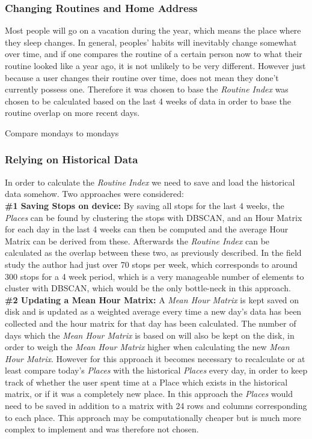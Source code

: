 \subsubsection*{Changing Routines and Home Address}
Most people will go on a vacation during the year, which means the place where they sleep changes. In general, peoples' habits will inevitably change somewhat over time, and if one compares the routine of a certain person now to what their routine looked like a year ago, it is not unlikely to be very different. However just because a user changes their routine over time, does not mean they done't currently possess one. Therefore it was chosen to base the \textit{Routine Index} was chosen to be calculated based on the last 4 weeks of data in order to base the routine overlap on more recent days.

Compare mondays to mondays

\subsubsection*{Relying on Historical Data}
In order to calculate the \textit{Routine Index} we need to save and load the historical data somehow. Two approaches were considered:\\

\textbf{\#1 Saving Stops on device:} By saving all stops for the last 4 weeks, the \textit{Places} can be found by clustering the stops with DBSCAN, and an Hour Matrix for each day in the last 4 weeks can then be computed and the average Hour Matrix can be derived from these. Afterwards the \textit{Routine Index} can be calculated as the overlap between these two, as previously described. In the field study the author had just over 70 stops per week, which corresponds to around 300 stops for a 4 week period, which is a very manageable number of elements to cluster with DBSCAN, which would be the only bottle-neck in this approach.\\

\textbf{\#2 Updating a Mean Hour Matrix:} A \textit{Mean Hour Matrix} is kept saved on disk and is updated as a weighted average every time a new day's data has been collected and the hour matrix for that day has been calculated. The number of days which the  \textit{Mean Hour Matrix} is based on will also be kept on the disk, in order to weigh the  \textit{Mean Hour Matrix} higher when calculating the new  \textit{Mean Hour Matrix}. However for this approach it becomes necessary to recalculate or at least compare today's \textit{Places} with the historical \textit{Places} every day, in order to keep track of whether the user spent time at a Place which exists in the historical matrix, or if it was a completely new place. In this approach the \textit{Places} would need to be saved in addition to a matrix with 24 rows and columns corresponding to each place. This approach may be computationally cheaper but is much more complex to implement and was therefore not chosen.

